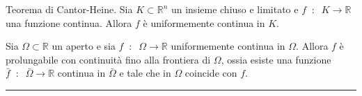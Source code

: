Teorema di Cantor-Heine. Sia $K\subset \mathbb{R}^n$ un insieme chiuso e limitato e $f \;\;:\;\; K \rightarrow \mathbb{R}$ una funzione continua. Allora $f$ è uniformemente continua in $K$.\newline

Sia $\Omega \subset \mathbb{R}$ un aperto e sia $f \;\;:\;\; \Omega \rightarrow \mathbb{R}$ uniformemente continua in $\Omega$. Allora $f$ è prolungabile con continuità fino alla frontiera di $\Omega$, ossia esiste una funzione $\bar{f} \;\;:\;\; \bar{\Omega} \rightarrow \mathbb{R}$ continua in $\bar{\Omega}$ e tale che in $\Omega$ coincide con $f$.\newline
\rule{\textwidth}{0.4pt}